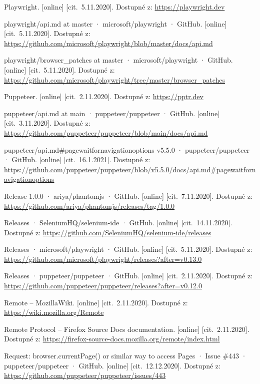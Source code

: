 \begin{flushleft}
\begin{thebibliography}{99}
 Playwright. [online] [cit.~5.11.2020]. Dostupné z: \url{https://playwright.dev}

 playwright/api.md at master · microsoft/playwright · GitHub. [online] [cit.~5.11.2020]. Dostupné z: \url{https://github.com/microsoft/playwright/blob/master/docs/api.md}

 playwright/browser\_patches at master · microsoft/playwright · GitHub. [online] [cit.~5.11.2020]. Dostupné z: \url{https://github.com/microsoft/playwright/tree/master/browser_patches}

 Puppeteer. [online] [cit.~2.11.2020]. Dostupné z: \url{https://pptr.dev}

 puppeteer/api.md at main · puppeteer/puppeteer · GitHub. [online] [cit.~3.11.2020]. Dostupné z: \url{https://github.com/puppeteer/puppeteer/blob/main/docs/api.md}

 puppeteer/api.md\#pagewaitfornavigationoptions v5.5.0 · puppeteer/puppe\-teer · GitHub. [online] [cit.~16.1.2021]. Dostupné z: \url{https://github.com/puppeteer/puppeteer/blob/v5.5.0/docs/api.md#pagewaitfornavigationoptions}

 Release 1.0.0 · ariya/phantomjs · GitHub. [online] [cit.~7.11.2020]. Dostupné z: \url{https://github.com/ariya/phantomjs/releases/tag/1.0.0}

 Releases · SeleniumHQ/selenium-ide · GitHub. [online] [cit.~14.11.2020]. Dostupné z: \url{https://github.com/SeleniumHQ/selenium-ide/releases}

 Releases · microsoft/playwright · GitHub. [online] [cit.~5.11.2020]. Dostupné z: \url{https://github.com/microsoft/playwright/releases?after=v0.13.0}

 Releases · puppeteer/puppeteer · GitHub. [online] [cit.~2.11.2020]. Dostupné z: \url{https://github.com/puppeteer/puppeteer/releases?after=v0.12.0}

 Remote -- MozillaWiki. [online] [cit.~2.11.2020]. Dostupné z: \url{https://wiki.mozilla.org/Remote}

 Remote Protocol -- Firefox Source Docs documentation. [online] [cit.~2.11.2020]. Dostupné z: \url{https://firefox-source-docs.mozilla.org/remote/index.html}

 Request: browser.currentPage() or similar way to access Pages · Issue \#443 · puppeteer/puppeteer · GitHub. [online] [cit.~12.12.2020]. Dostupné z: \url{https://github.com/puppeteer/puppeteer/issues/443}


\end{thebibliography}
\end{flushleft}
